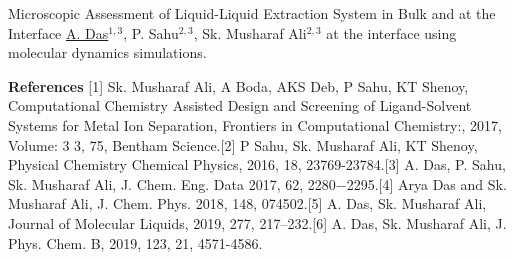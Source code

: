 \begin{abstract_online}{Microscopic Assessment of Liquid-Liquid Extraction System in Bulk and at the Interface}{%
        \underline{A. Das}$^{1, 3}$, P. Sahu$^{2, 3}$, Sk. Musharaf Ali$^{2, 3}$}{%
        \IStag}
at the interface using molecular dynamics simulations. 
    
        \textbf{References} \newline{}[1] Sk. Musharaf Ali, A Boda, AKS Deb, P Sahu, KT Shenoy, Computational Chemistry Assisted Design and Screening of Ligand-Solvent Systems for Metal Ion Separation, Frontiers in Computational Chemistry:, 2017, Volume: 3 3, 75, Bentham Science.\newline{}[2] P Sahu, Sk. Musharaf Ali, KT Shenoy, Physical Chemistry Chemical Physics, 2016, 18, 23769-23784.\newline{}[3] A. Das, P. Sahu, Sk. Musharaf Ali, J. Chem. Eng. Data 2017, 62, 2280−2295.\newline{}[4] Arya Das and Sk. Musharaf Ali,    J. Chem. Phys. 2018, 148, 074502.\newline{}[5] A. Das, Sk. Musharaf Ali, Journal of Molecular Liquids, 2019, 277, 217–232.\newline{}[6] A. Das, Sk. Musharaf Ali, J. Phys. Chem. B, 2019, 123, 21, 4571-4586.
    \end{abstract_online}
    
